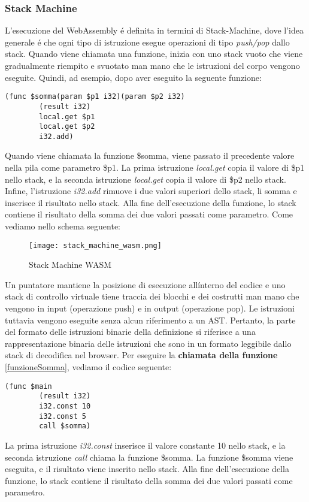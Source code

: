 \documentclass[../../main.tex]{subfiles}
\begin{document}
\subsubsection{Stack Machine}
L'esecuzione del WebAssembly é definita in termini di Stack-Machine, dove l'idea generale é che ogni tipo di istruzione esegue operazioni di tipo \textit{push/pop} dallo stack.
Quando viene chiamata una funzione, inizia con uno stack vuoto che viene gradualmente riempito e svuotato man mano che le istruzioni del corpo vengono eseguite. Quindi, ad esempio, dopo aver eseguito la seguente funzione:
\begin{lstlisting}[language=WebAssembly, label={lst:funzioneSomma}]
    (func $somma(param $p1 i32)(param $p2 i32)
        (result i32)
        local.get $p1
        local.get $p2
        i32.add)
\end{lstlisting}
Quando viene chiamata la funzione \$somma, viene passato il precedente valore nella pila come parametro \$p1. La prima istruzione \textit{local.get} copia il valore di \$p1 nello stack, e la seconda istruzione \textit{local.get} copia il valore di \$p2 nello stack. Infine, l'istruzione \textit{i32.add} rimuove i due valori superiori dello stack, li somma e inserisce il risultato nello stack. Alla fine dell'esecuzione della funzione, lo stack contiene il risultato della somma dei due valori passati come parametro.
Come vediamo nello schema seguente:
\begin{figure}[H]
    \centering
    \texttt{[image: stack\_machine\_wasm.png]}
    \caption{Stack Machine WASM}
    \label{fig:stack_machine}
\end{figure}
Un puntatore mantiene la posizione di esecuzione all\' interno del codice e uno stack di controllo virtuale tiene traccia dei blocchi e dei costrutti man mano che vengono in input (operazione push) e in output (operazione pop). Le istruzioni tuttavia vengono eseguite senza alcun riferimento a un AST. Pertanto, la parte del formato delle istruzioni binarie della definizione si riferisce a una rappresentazione binaria delle istruzioni che sono in un formato leggibile dallo stack di decodifica nel browser.\autocite{amslaurea20464}
Per eseguire la \textbf{chiamata della funzione} \ref{funzioneSomma}, vediamo il codice seguente:
\begin{lstlisting}[language=WebAssembly]
    (func $main
        (result i32)
        i32.const 10
        i32.const 5
        call $somma)
\end{lstlisting}
La prima istruzione \textit{i32.const} inserisce il valore constante 10 nello stack, e la seconda istruzione \textit{call} chiama la funzione \$somma. La funzione \$somma viene eseguita, e il risultato viene inserito nello stack. Alla fine dell'esecuzione della funzione, lo stack contiene il risultato della somma dei due valori passati come parametro.
\end{document}

